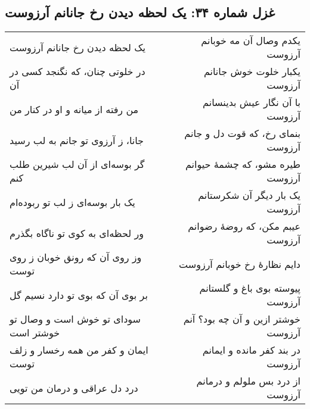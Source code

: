 \begin{center}
\section*{غزل شماره ۳۴: یک لحظه دیدن رخ جانانم آرزوست}
\label{sec:034}
\begin{longtable}{l p{0.5cm} r}
یک لحظه دیدن رخ جانانم آرزوست
&&
یکدم وصال آن مه خوبانم آرزوست
\\
در خلوتی چنان، که نگنجد کسی در آن
&&
یکبار خلوت خوش جانانم آرزوست
\\
من رفته از میانه و او در کنار من
&&
با آن نگار عیش بدینسانم آرزوست
\\
جانا، ز آرزوی تو جانم به لب رسید
&&
بنمای رخ، که قوت دل و جانم آرزوست
\\
گر بوسه‌ای از آن لب شیرین طلب کنم
&&
طیره مشو، که چشمهٔ حیوانم آرزوست
\\
یک بار بوسه‌ای ز لب تو ربوده‌ام
&&
یک بار دیگر آن شکرستانم آرزوست
\\
ور لحظه‌ای به کوی تو ناگاه بگذرم
&&
عیبم مکن، که روضهٔ رضوانم آرزوست
\\
وز روی آن که رونق خوبان ز روی توست
&&
دایم نظارهٔ رخ خوبانم آرزوست
\\
بر بوی آن که بوی تو دارد نسیم گل
&&
پیوسته بوی باغ و گلستانم آرزوست
\\
سودای تو خوش است و وصال تو خوشتر است
&&
خوشتر ازین و آن چه بود؟ آنم آرزوست
\\
ایمان و کفر من همه رخسار و زلف توست
&&
در بند کفر مانده و ایمانم آرزوست
\\
درد دل عراقی و درمان من تویی
&&
از درد بس ملولم و درمانم آرزوست
\\
\end{longtable}
\end{center}
